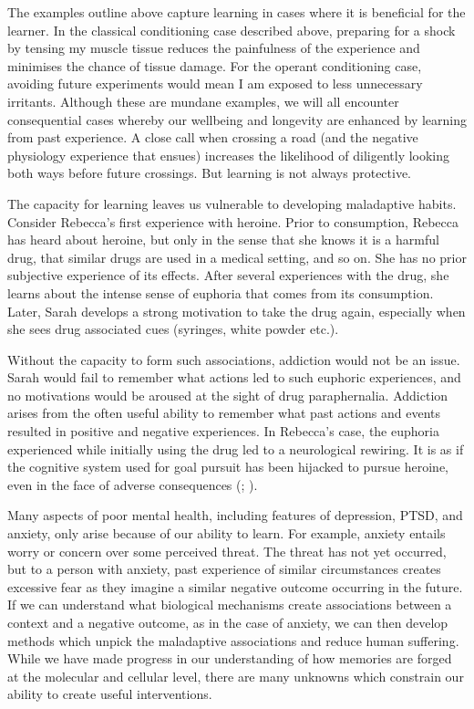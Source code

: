 \documentclass[
  jou,
  floatsintext,
  longtable,
  nolmodern,
  notxfonts,
  notimes,
  donotrepeattitle,
  colorlinks=true,linkcolor=blue,citecolor=blue,urlcolor=blue]{apa7}
\begin{document}
The examples outline above capture learning in cases where it is
beneficial for the learner. In the classical conditioning case described
above, preparing for a shock by tensing my muscle tissue reduces the
painfulness of the experience and minimises the chance of tissue damage.
For the operant conditioning case, avoiding future experiments would
mean I am exposed to less unnecessary irritants. Although these are
mundane examples, we will all encounter consequential cases whereby our
wellbeing and longevity are enhanced by learning from past experience. A
close call when crossing a road (and the negative physiology experience
that ensues) increases the likelihood of diligently looking both ways
before future crossings. But learning is not always protective.

The capacity for learning leaves us vulnerable to developing maladaptive
habits. Consider Rebecca's first experience with heroine. Prior to
consumption, Rebecca has heard about heroine, but only in the sense that
she knows it is a harmful drug, that similar drugs are used in a medical
setting, and so on. She has no prior subjective experience of its
effects. After several experiences with the drug, she learns about the
intense sense of euphoria that comes from its consumption. Later, Sarah
develops a strong motivation to take the drug again, especially when she
sees drug associated cues (syringes, white powder etc.).

Without the capacity to form such associations, addiction would not be
an issue. Sarah would fail to remember what actions led to such euphoric
experiences, and no motivations would be aroused at the sight of drug
paraphernalia. Addiction arises from the often useful ability to
remember what past actions and events resulted in positive and negative
experiences. In Rebecca's case, the euphoria experienced while initially
using the drug led to a neurological rewiring. It is as if the cognitive
system used for goal pursuit has been hijacked to pursue heroine, even
in the face of adverse consequences
(;
).

Many aspects of poor mental health, including features of depression,
PTSD, and anxiety, only arise because of our ability to learn. For
example, anxiety entails worry or concern over some perceived threat.
The threat has not yet occurred, but to a person with anxiety, past
experience of similar circumstances creates excessive fear as they
imagine a similar negative outcome occurring in the future. If we can
understand what biological mechanisms create associations between a
context and a negative outcome, as in the case of anxiety, we can then
develop methods which unpick the maladaptive associations and reduce
human suffering. While we have made progress in our understanding of how
memories are forged at the molecular and cellular level, there are many
unknowns which constrain our ability to create useful interventions.
\end{document}
